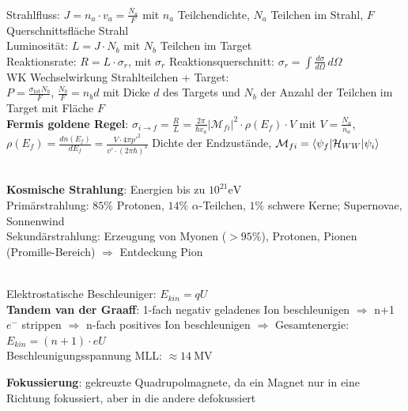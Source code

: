 \documentclass[10pt,twoside,a4paper]{article}
\begin{document}
\begin{multicols*}{3}
\ \\
Strahlfluss: $J = n_a \cdot v_a = \frac{\dot{N_a}}{F}$ mit $n_a$ Teilchendichte, $N_a$ Teilchen im Strahl, $F$ Querschnittsfläche Strahl \\
Luminosität: $L = J \cdot N_b$ mit $N_b$ Teilchen im Target \\
Reaktionsrate: $R = L \cdot \sigma_r$, mit $\sigma_r$ Reaktionsquerschnitt: $\sigma_r = \int \frac{d\sigma}{d\Omega} \,d\Omega$  \\
WK Wechselwirkung Strahlteilchen + Target: \\
$P = \frac{\sigma_{\text{tot}} N_{b}}{F}$, $\frac{N_{b}}{F} = n_{b} d$ mit Dicke $d$ des Targets und $N_b$ der Anzahl der Teilchen im Target mit Fläche $F$ \\
\textbf{Fermis goldene Regel}: $\sigma_{i \rightarrow f} = \frac{R}{L} = \frac{2 \pi}{\hbar v_a} \left| \mathcal{M}_{fi} \right| ^2 \cdot \rho \left( E_f \right) \cdot V$ mit $V = \frac{N_a}{n_a}$, $\rho \left( E_f \right) = \frac{dn \left( E_f \right)}{dE_f} = \frac{V \cdot 4 \pi p'^2}{v' \cdot (2 \pi \hbar)^3}$ Dichte der Endzustände, $\mathcal{M}_{fi} = \braket{\psi_f|\mathcal{H}_{WW}|\psi_i}$

\ \\
\textbf{Kosmische Strahlung}: Energien bis zu $10^{21} \si{\eV}$ \\
Primärstrahlung: $85\%$ Protonen, $14\%$ $\alpha$-Teilchen, $1\%$ schwere Kerne; Supernovae, Sonnenwind \\
Sekundärstrahlung: Erzeugung von Myonen ($> 95\%$), Protonen, Pionen (Promille-Bereich) $\Rightarrow$ Entdeckung Pion

\ \\
Elektrostatische Beschleuniger: $E_{kin} = q U$ \\
\textbf{Tandem van der Graaff}: 1-fach negativ geladenes Ion beschleunigen $\Rightarrow$ n+1 $e^-$ strippen $\Rightarrow$ n-fach positives Ion beschleunigen $\Rightarrow$ Gesamtenergie: $E_{kin} = (n+1) \cdot e U$ \\
Beschleunigungsspannung MLL: $\approx \SI{14}{\mega\V}$

\textbf{Fokussierung}: gekreuzte Quadrupolmagnete, da ein Magnet nur in eine Richtung fokussiert, aber in die andere defokussiert


\end{multicols*}
\end{document}
